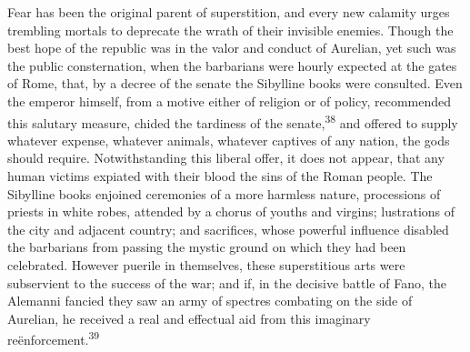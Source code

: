 



Fear has been the original parent of superstition, and every new
calamity urges trembling mortals to deprecate the wrath of their
invisible enemies. Though the best hope of the republic was in
the valor and conduct of Aurelian, yet such was the public
consternation, when the barbarians were hourly expected at the
gates of Rome, that, by a decree of the senate the Sibylline
books were consulted. Even the emperor himself, from a motive
either of religion or of policy, recommended this salutary
measure, chided the tardiness of the senate,\textsuperscript{38} and offered to
supply whatever expense, whatever animals, whatever captives of
any nation, the gods should require. Notwithstanding this liberal
offer, it does not appear, that any human victims expiated with
their blood the sins of the Roman people. The Sibylline books
enjoined ceremonies of a more harmless nature, processions of
priests in white robes, attended by a chorus of youths and
virgins; lustrations of the city and adjacent country; and
sacrifices, whose powerful influence disabled the barbarians from
passing the mystic ground on which they had been celebrated.
However puerile in themselves, these superstitious arts were
subservient to the success of the war; and if, in the decisive
battle of Fano, the Alemanni fancied they saw an army of spectres
combating on the side of Aurelian, he received a real and
effectual aid from this imaginary reënforcement.\textsuperscript{39}



